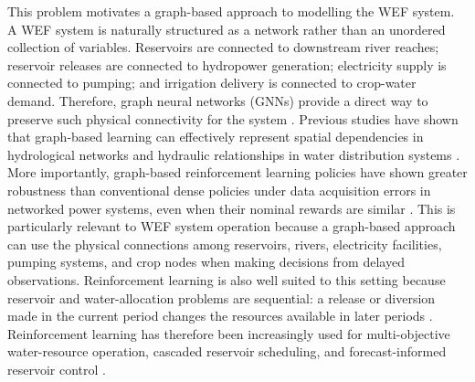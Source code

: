 \documentclass [a4paper,fleqn] {cas-dc}
\begin{document}
This problem motivates a graph-based approach to modelling the WEF system. A WEF system is naturally structured as a network rather than an unordered collection of variables. Reservoirs are connected to downstream river reaches; reservoir releases are connected to hydropower generation; electricity supply is connected to pumping; and irrigation delivery is connected to crop-water demand. Therefore, graph neural networks (GNNs) provide a direct way to preserve such physical connectivity for the system \citep{velickovic2018,jiang2020,niu2021,mei2026}. Previous studies have shown that graph-based learning can effectively represent spatial dependencies in hydrological networks \citep{Sun2021HydrologyGNN} and hydraulic relationships in water distribution systems \citep{Truong2024WDNGNN}. More importantly, graph-based reinforcement learning policies have shown greater robustness than conventional dense policies under data acquisition errors in networked power systems, even when their nominal rewards are similar \citep{Lee2022GraphPolicyVoltVar}. This is particularly relevant to WEF system operation because a graph-based approach can use the physical connections among reservoirs, rivers, electricity facilities, pumping systems, and crop nodes when making decisions from delayed observations. Reinforcement learning is also well suited to this setting because reservoir and water-allocation problems are sequential: a release or diversion made in the current period changes the resources available in later periods \citep{haarnoja2018}. Reinforcement learning has therefore been increasingly used for multi-objective water-resource operation, cascaded reservoir scheduling, and forecast-informed reservoir control \citep{Castelletti2013MultiobjectiveRL,Xu2020CascadedReservoirDRL,Zanutto2025ForecastRL,Wu2024TransformerDRLReservoir,Xie2026LongHorizonReservoirDRL,hooshyar2020}.

\end{document}

